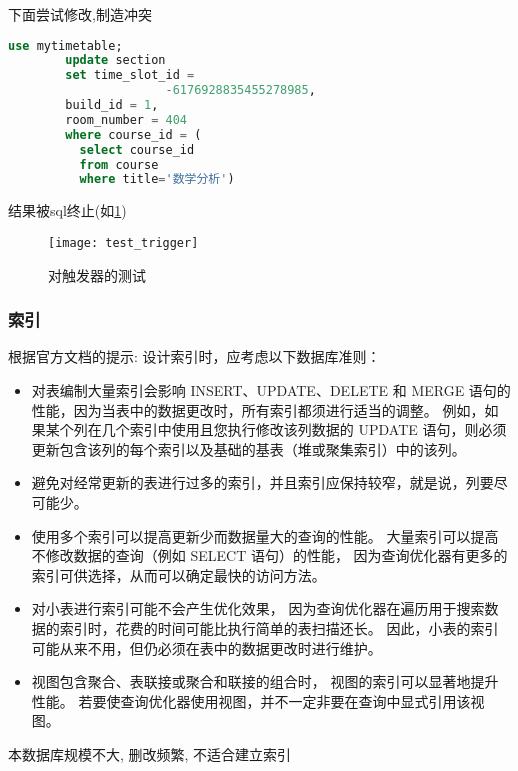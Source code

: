 \documentclass{myreport}
\begin{document}
      下面尝试修改,制造冲突
      \begin{lstlisting}[language=sql]
        use mytimetable;
        update section
        set time_slot_id =
                      -6176928835455278985,
        build_id = 1,
        room_number = 404
        where course_id = (
          select course_id
          from course
          where title='数学分析')
      \end{lstlisting}

      结果被sql终止(如\cref{fig:teset_trigger})
      \begin{figure}[H]
        \centering
        \texttt{[image: test\_trigger]}
        \caption{对触发器的测试}
        \label{fig:teset_trigger}
      \end{figure}
    \subsubsection{索引}
      根据官方文档的提示:
      设计索引时，应考虑以下数据库准则：
      \begin{itemize}
        \item 对表编制大量索引会影响 INSERT、UPDATE、DELETE 和 MERGE 语句的性能，因为当表中的数据更改时，所有索引都须进行适当的调整。
        例如，如果某个列在几个索引中使用且您执行修改该列数据的 UPDATE 语句，则必须更新包含该列的每个索引以及基础的基表（堆或聚集索引）中的该列。
        \item 避免对经常更新的表进行过多的索引，并且索引应保持较窄，就是说，列要尽可能少。
        \item 使用多个索引可以提高更新少而数据量大的查询的性能。
        大量索引可以提高不修改数据的查询（例如 SELECT 语句）的性能，
        因为查询优化器有更多的索引可供选择，从而可以确定最快的访问方法。
        \item 对小表进行索引可能不会产生优化效果，
        因为查询优化器在遍历用于搜索数据的索引时，花费的时间可能比执行简单的表扫描还长。
        因此，小表的索引可能从来不用，但仍必须在表中的数据更改时进行维护。
        \item 视图包含聚合、表联接或聚合和联接的组合时，
        视图的索引可以显著地提升性能。
        若要使查询优化器使用视图，并不一定非要在查询中显式引用该视图。
      \end{itemize}
      本数据库规模不大, 删改频繁, 不适合建立索引
\end{document}
